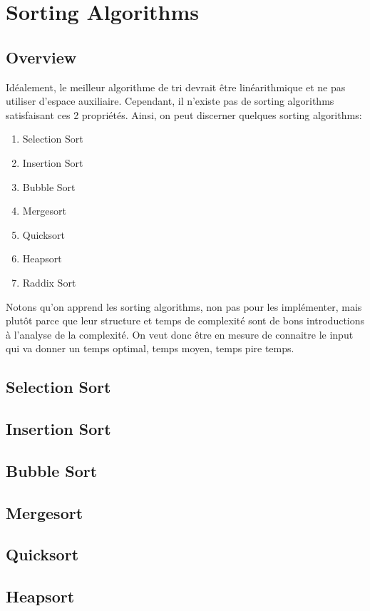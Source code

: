 \documentclass{article}
\begin{document}
\section{Sorting Algorithms}

\subsection{Overview}

Idéalement, le meilleur algorithme de tri devrait être linéarithmique
et ne pas utiliser d'espace auxiliaire. Cependant, il n'existe pas de
sorting algorithms satisfaisant ces 2 propriétés. Ainsi, on peut
discerner quelques sorting algorithms:

\begin{enumerate}
    \item Selection Sort
    \item Insertion Sort
    \item Bubble Sort
    \item Mergesort
    \item Quicksort
    \item Heapsort
    \item Raddix Sort
\end{enumerate}

Notons qu'on apprend les sorting algorithms, non pas pour les implémenter,
mais plutôt parce que leur structure et temps de complexité sont de bons
introductions à l'analyse de la complexité. On veut donc être en mesure
de connaitre le input qui va donner un temps optimal, temps moyen, temps
pire temps.

\subsection{Selection Sort}
\subsection{Insertion Sort}
\subsection{Bubble Sort}
\subsection{Mergesort}
\subsection{Quicksort}
\subsection{Heapsort}
\end{document}
